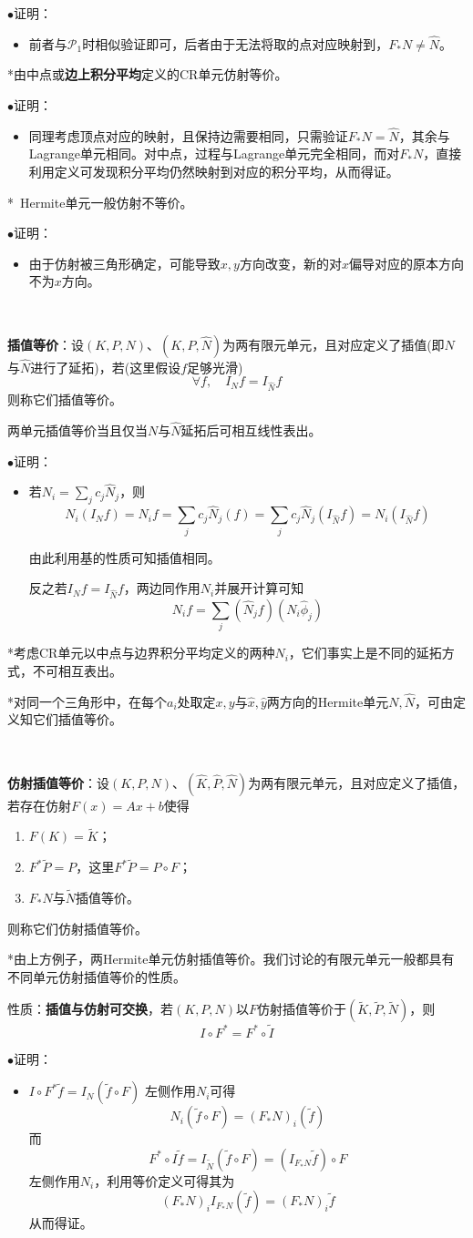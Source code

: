 \documentclass[a4paper,UTF8,fontset=windows]{ctexart}
\newcommand*{\cp}{\mathcal{P}}
\newcommand{\proo}[1]{{\kaishu $\bullet$证明：
\begin{itemize}
    \item[] #1
\end{itemize}
}}
\begin{document}
\proo{
    前者与$\cp_1$时相似验证即可，后者由于无法将取的点对应映射到，$F_*N\ne\hat{N}$。
}

*由中点或\textbf{边上积分平均}定义的CR单元仿射等价。

\proo{
    同理考虑顶点对应的映射，且保持边需要相同，只需验证$F_*N=\hat{N}$，其余与Lagrange单元相同。对中点，过程与Lagrange单元完全相同，而对$F_*N$，直接利用定义可发现积分平均仍然映射到对应的积分平均，从而得证。
}

*\ Hermite单元一般仿射不等价。

\proo{
    由于仿射被三角形确定，可能导致$x,y$方向改变，新的对$x$偏导对应的原本方向不为$x$方向。
}

\

\textbf{插值等价}：设$(K,P,N)$、$(K,P,\hat{N})$为两有限元单元，且对应定义了插值(即$N$与$\hat{N}$进行了延拓)，若(这里假设$f$足够光滑)
$$\forall f,\quad I_Nf=I_{\hat{N}}f$$
则称它们插值等价。

两单元插值等价当且仅当$N$与$\hat{N}$延拓后可相互线性表出。

\proo{
    若$N_i=\sum_jc_j\hat{N}_j$，则
    $$N_i(I_Nf)=N_if=\sum_jc_j\hat{N}_j(f)=\sum_jc_j\hat{N}_j(I_{\hat{N}}f)=N_i(I_{\hat{N}}f)$$

    由此利用基的性质可知插值相同。

    反之若$I_Nf=I_{\hat{N}}f$，两边同作用$N_i$并展开计算可知
    $$N_if=\sum_j(\hat{N}_jf)(N_i\hat{\phi}_j)$$
}

*考虑CR单元以中点与边界积分平均定义的两种$N_i$，它们事实上是不同的延拓方式，不可相互表出。

*对同一个三角形中，在每个$a_i$处取定$x,y$与$\hat{x},\hat{y}$两方向的Hermite单元$N,\hat{N}$，可由定义知它们插值等价。

\

\textbf{仿射插值等价}：设$(K,P,N)$、$(\hat{K},\hat{P},\hat{N})$为两有限元单元，且对应定义了插值，若存在仿射$F(x)=Ax+b$使得
\begin{enumerate}
    \item $F(K)=\tilde{K}$；
    \item $F^*\tilde{P}=P$，这里$F^*\tilde{P}=P\circ F$；
    \item $F_*N$与$\tilde{N}$插值等价。
\end{enumerate}
则称它们仿射插值等价。

*由上方例子，两Hermite单元仿射插值等价。我们讨论的有限元单元一般都具有不同单元仿射插值等价的性质。

性质：\textbf{插值与仿射可交换}，若$(K,P,N)$以$F$仿射插值等价于$(\tilde{K},\tilde{P},\tilde{N})$，则
$$I\circ F^*=F^*\circ\tilde{I}$$
\proo{
    $I\circ F^*\tilde{f}=I_N(\tilde{f}\circ F)$
    左侧作用$N_i$可得
    $$N_i(\tilde{f}\circ F)=(F_*N)_i(\tilde{f})$$
    而
    $$F^*\circ I\tilde{f}=I_{\tilde{N}}(\tilde{f}\circ F)=(I_{F_*N}\tilde{f})\circ F$$
    左侧作用$N_i$，利用等价定义可得其为
    $$(F_*N)_iI_{F_*N}(\tilde{f})=(F_*N)_i\tilde{f}$$
    从而得证。
}
\end{document}

